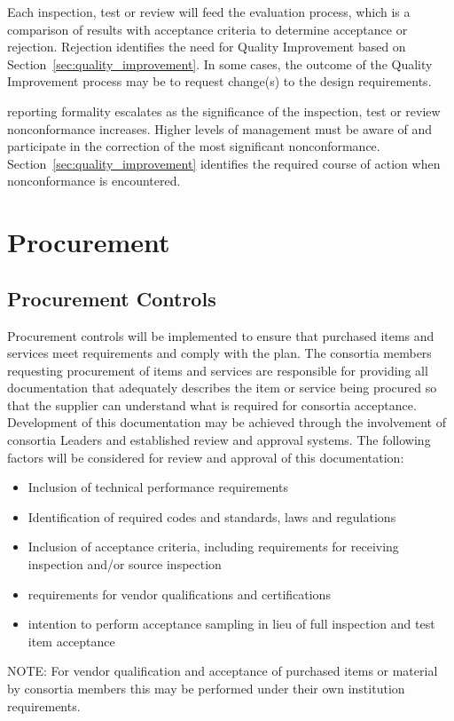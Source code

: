 Each inspection, test or review will feed the  evaluation
process, which is a comparison of results with acceptance criteria to
determine acceptance or rejection. Rejection identifies the need for
Quality Improvement based on Section~\ref{sec:quality_improvement}. In
some cases, the outcome of the Quality Improvement process may be to
request change(s) to the design requirements.

 reporting formality escalates as the significance of the
inspection, test or review nonconformance increases. Higher levels of
management must be aware of and participate in the correction of the
most significant nonconformance. Section~\ref{sec:quality_improvement}
identifies the required course of action when nonconformance is
encountered.

\section{Procurement}

\subsection{Procurement Controls}

Procurement controls will be implemented to ensure that
purchased items and services meet  requirements and comply
with the   plan.  The consortia members
requesting procurement of items and services are responsible for
providing all documentation that adequately describes the item or
service being procured so that the supplier can understand what is
required for consortia acceptance. Development of this documentation
may be achieved through the involvement of consortia Leaders and
established review and approval systems. The following factors will be
considered for review and approval of this documentation:
\begin{itemize}
 \item Inclusion of technical performance requirements
 \item Identification of required codes and standards, laws and
   regulations
 \item Inclusion of acceptance criteria, including requirements for
   receiving inspection and/or source inspection
 \item {} requirements for vendor qualifications and
   certifications
 \item {} intention to perform acceptance sampling in lieu
   of full inspection and test item acceptance
\end{itemize}
NOTE: For vendor qualification and acceptance of purchased items or
material by consortia members this may be performed under their own
institution requirements.

